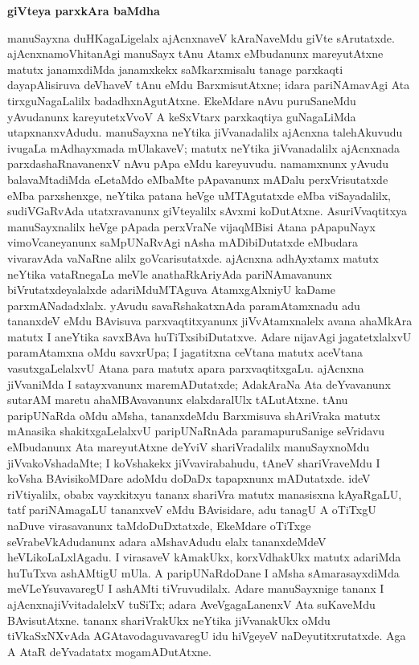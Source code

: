 \begin{center}
\textbf{\Large{giVteya parxkAra baMdha}}
\end{center}

manuSayxna duHKagaLigelalx ajAcnxnaveV kAraNaveMdu giVte sArutatxde. ajAcnxna\-moVhitanAgi manuSayx tAnu Atamx eMbudanunx mareyutAtxne matutx janamxdiMda janamxkekx saMkarxmisalu tanage parxkaqti dayapAlisiruva deVhaveV tAnu eMdu BarxmisutAtxne; idara pariNAmavAgi Ata tirxguNagaLalilx badadhxnAgutAtxne. EkeMdare nAvu puruSaneMdu yAvudanunx kareyutetxVvoV A keSxVtarx parxkaqtiya guNagaLiMda utapxnanxvAdudu. manuSayxna neYtika jiVvanadalilx ajAcnxna talehAkuvudu ivugaLa mAdhayxmada mUlakaveV; matutx neYtika jiVvanadalilx ajAcnxnada parxdashaRnavanenxV nAvu pApa eMdu kareyuvudu. namamxnunx yAvudu balavaMtadiMda eLetaMdo eMbaMte pApavanunx mADalu perxVrisutatxde eMba parxshenxge, neYtika patana heVge uMTAgutatxde eMba viSayadalilx, sudiVGaRvAda utatxravanunx giVteyalilx sAvxmi koDutAtxne. AsuriVvaqtitxya manuSayxnalilx heVge pApada perxVraNe vijaqMBisi Atana pApapuNayx vimoVcaneyanunx saMpUNaRvAgi nAsha mADibiDutatxde eMbudara vivaravAda vaNaRne alilx goVcarisutatxde. ajAcnxna adhAyxtamx matutx neYtika vataRnegaLa meVle anathaRkAriyAda pariNAmavanunx biVrutatxdeyalalxde adariMduMTAguva AtamxgAlxniyU kaDame parxmANadadxlalx. yAvudu savaRshakatxnAda paramAtamxnadu adu tananxdeV eMdu BAvisuva parxvaqtitxyanunx jiVvAtamxnalelx avana ahaMkAra matutx I aneYtika savxBAva huTiTxsibiDutatxve. Adare nijavAgi jagatetxlalxvU paramAtamxna oMdu savxrUpa; I jagatitxna ceVtana matutx aceVtana vasutxgaLelalxvU Atana para matutx apara parxvaqtitxgaLu. ajAcnxna jiVvaniMda I satayxvanunx maremADutatxde; AdakAraNa Ata deYvavanunx sutarAM maretu ahaMBAvavanunx elalxdaralUlx tALutAtxne. tAnu paripUNaRda oMdu aMsha, tananxdeMdu Barxmisuva shAriVraka matutx mAnasika shakitxgaLelalxvU paripUNaRnAda paramapuruSanige seVridavu eMbudanunx Ata mareyutAtxne deYviV shariVradalilx manuSayxnoMdu jiVvakoVshadaMte; I koVshakekx jiVvavirabahudu, tAneV shariVraveMdu I koVsha BAvisikoMDare adoMdu doDaDx tapapxnunx mADutatxde. ideV riVtiyalilx, obabx vayxkitxyu tananx shariVra matutx manasisxna kAyaRgaLU, tatf pariNAmagaLU tananxveV eMdu BAvisidare, adu tanagU A oTiTxgU naDuve virasavanunx taMdoDuDxtatxde, EkeMdare oTiTxge seVrabeVkAdudanunx adara aMshavAdudu elalx tananxdeMdeV heVLikoLaLxlAgadu. I virasaveV kAmakUkx, korxVdhakUkx matutx adariMda huTuTxva ashAMtigU mUla. A paripUNaRdoDane I aMsha sAmarasayxdiMda meVLeYsuvavaregU I ashAMti tiVruvudilalx. Adare manuSayxnige tananx I ajAcnxnajiVvitadalelxV tuSiTx; adara AveVgagaLanenxV Ata suKaveMdu BAvisutAtxne. tananx shariVrakUkx neYtika jiVvanakUkx oMdu tiVkaSxNXvAda AGAtavodaguvavaregU idu hiVgeyeV naDeyutitxrutatxde. Aga A AtaR deYvadatatx mogamADutAtxne.

